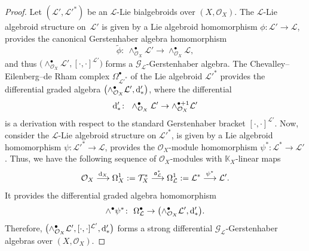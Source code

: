 \documentclass[pdftex]{sigma}
\numberwithin{equation}{section}
\theoremstyle{definition}
\begin{document}
\begin{proof}
	Let $(\mathcal{L}', \mathcal{L}'^*)$ be an $\mathcal{L}$-Lie bialgebroids over $(X, \mathcal{O}_X)$. The $\mathcal{L}$-Lie algebroid structure on~$\mathcal{L}'$ is given by a Lie algebroid homomorphism $\phi\colon \mathcal{L}' \rightarrow \mathcal{L}$, provides the canonical Gerstenhaber algebra homomorphism
\[
\tilde{\phi}\colon \ \wedge^\bullet_{\mathcal{O}_X} \mathcal{L'} \rightarrow \wedge^\bullet_{\mathcal{O}_X} \mathcal{L},
\]
	and thus $\bigl(\wedge^\bullet_{\mathcal{O}_X} \mathcal{L'},[\cdot,\cdot]^{\mathcal{L}'}\bigr)$ forms a $\mathcal{G}_{\mathcal{L}}$-Gerstenhaber algebra.
	The Chevalley--Eilenberg--de Rham complex $\Omega^\bullet_{\mathcal{L}'^*}$ of the Lie algebroid $\mathcal{L}'^*$ provides the differential graded algebra $\bigl(\wedge^\bullet_{\mathcal{O}_X} \mathcal{L}', {\rm d}'_*\bigr)$, where the differential
\[
{\rm d}'_*\colon \ \wedge^\bullet_{\mathcal{O}_X} \mathcal{L}' \rightarrow \wedge^{\bullet +1}_{\mathcal{O}_X} \mathcal{L}'
\]
 is a derivation with respect to the standard Gerstenhaber bracket $[\cdot,\cdot]^{\mathcal{L}'}$. Now, consider the $\mathcal{L}$-Lie algebroid structure on $\mathcal{L}'^*$, is given by a Lie algebroid homomorphism $\psi\colon \mathcal{L}'^* \rightarrow \mathcal{L}$, provides the $\mathcal{O}_X$-module homomorphism $\psi^*\colon \mathcal{L}^* \rightarrow \mathcal{L}'$. Thus, we have the following sequence of $\mathcal{O}_X$-modules with $\mathbb{K}_X$-linear maps
\[
\mathcal{O}_X \overset{{\rm d}_X}{\longrightarrow}\Omega^1_X := \mathcal{T}_X^* \overset{\mathfrak{a}_{\mathcal{L}}^*}{\longrightarrow} \Omega^1_{\mathcal{L}}:=\mathcal{L}^* \overset{\psi^*}{\longrightarrow} {\mathcal{L}'}.
\]
	It provides the differential graded algebra homomorphism
\[
\wedge^\bullet \psi^*\colon \ \Omega^\bullet_{\mathcal{L}} \rightarrow \bigl(\wedge^\bullet_{\mathcal{O}_X} \mathcal{L'}, {\rm d}'_*\bigr).
\]
	Therefore, $\bigl(\wedge^\bullet_{\mathcal{O}_X} \mathcal{L'}, [\cdot, \cdot]^{\mathcal{L}'}, {\rm d}'_*\bigr)$ forms a strong differential $\mathcal{G}_{\mathcal{L}}$-Gerstenhaber algebras over $(X, \mathcal{O}_X)$.
	

\end{proof}
\end{document}
